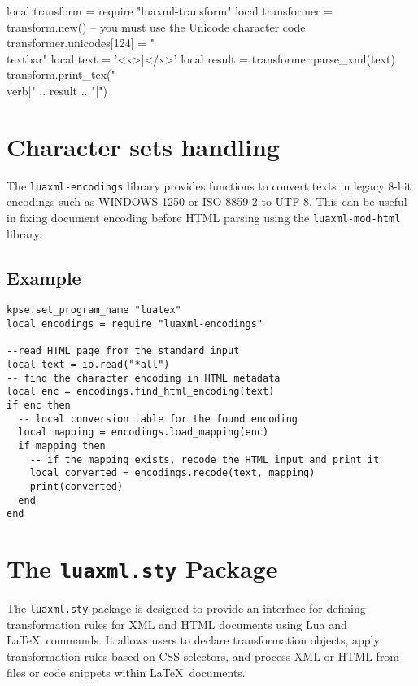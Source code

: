 \documentclass{ltxdoc}
\begin{document}
\begin{framed}
\begin{luacode*}
local transform = require "luaxml-transform"
local transformer = transform.new()
-- you must use the Unicode character code
transformer.unicodes[124] = "\\textbar"
local text = '<x>|</x>'
local result = transformer:parse_xml(text)
transform.print_tex("\\verb|" .. result .. "|")
\end{luacode*}
\end{framed}

\section{Character sets handling}

The \texttt{luaxml-encodings} library provides functions to convert texts in legacy 8-bit encodings such as WINDOWS-1250 
or ISO-8859-2 to UTF-8. This can be useful in fixing document encoding before HTML parsing using the \texttt{luaxml-mod-html}
library. 

\subsection{Example}


\begin{verbatim}
kpse.set_program_name "luatex"
local encodings = require "luaxml-encodings"

--read HTML page from the standard input
local text = io.read("*all")
-- find the character encoding in HTML metadata
local enc = encodings.find_html_encoding(text)
if enc then
  -- local conversion table for the found encoding
  local mapping = encodings.load_mapping(enc)
  if mapping then
    -- if the mapping exists, recode the HTML input and print it
    local converted = encodings.recode(text, mapping)
    print(converted)
  end
end
\end{verbatim}

\section{The \texttt{luaxml.sty} Package}

The \texttt{luaxml.sty} package is designed to provide an interface for defining
transformation rules for XML and HTML documents using Lua and \LaTeX\ commands.
It allows users to declare transformation objects, apply transformation rules
based on CSS selectors, and process XML or HTML from files or code snippets
within \LaTeX\ documents.
\end{document}

